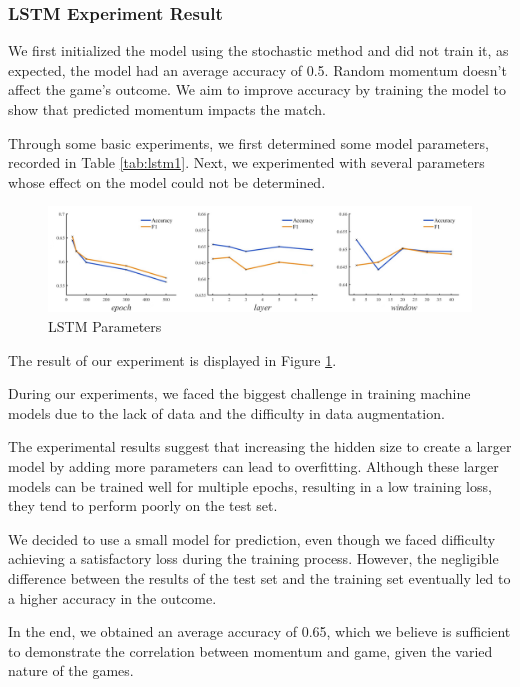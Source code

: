 \subsubsection{LSTM Experiment Result}
We first initialized the model using the stochastic method and did not train it, as expected, the model had an average accuracy of 0.5. Random momentum doesn't affect the game's outcome. We aim to improve accuracy by training the model to show that predicted momentum impacts the match. \par

Through some basic experiments, we first determined some model parameters, recorded in Table \ref{tab:lstm1}. 
Next, we experimented with several parameters whose effect on the model could not be determined. 
\begin{figure}[bt!]
    \centering
    \includegraphics[width=1\linewidth]{figure/lstm1.jpg}
    \caption{\centering LSTM Parameters}
    \label{fig:lstm1}
\end{figure}
The result of our experiment is displayed in Figure \ref{fig:lstm1}. \par
During our experiments, we faced the biggest challenge in training machine models due to the lack of data and the difficulty in data augmentation. \par 
The experimental results suggest that increasing the hidden size to create a larger model by adding more parameters can lead to overfitting. Although these larger models can be trained well for multiple epochs, resulting in a low training loss, they tend to perform poorly on the test set. \par
We decided to use a small model for prediction, even though we faced difficulty achieving a satisfactory loss during the training process. However, the negligible difference between the results of the test set and the training set eventually led to a higher accuracy in the outcome.\par
In the end, we obtained an average accuracy of 0.65, which we believe is sufficient to demonstrate the correlation between momentum and game, given the varied nature of the games. \par



